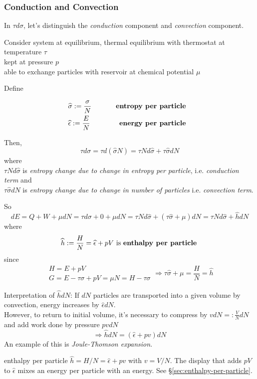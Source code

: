 \subsubsection{Conduction and Convection}\label{SubsubSec:ConductionConvection}

In $\tau d\sigma$, let's distinguish the \emph{conduction} component and \emph{convection} component.

Consider system at equilibrium, thermal equilibrium with thermostat at temperature $\tau$ \\
\qquad kept at pressure $p$ \\
\qquad able to exchange particles with reservoir at chemical potential $\mu$

Define

\[
\begin{aligned}
  & \widehat{\sigma} := \frac{ \sigma}{N } \qquad \, & \text{ \textbf{entropy per particle } } \\
  & \widehat{\epsilon} := \frac{ E}{N } \qquad \, & \text{ \textbf{energy per particle } } 
\end{aligned}
\]

Then, 
\[
\boxed{ 
\tau d\sigma = \tau d(\widehat{\sigma}N) = \tau N d\widehat{\sigma} + \tau \widehat{\sigma} dN
}
\]
where \\

$\tau N d\widehat{\sigma}$ is \emph{entropy change due to change in entropy per particle}, i.e. \emph{conduction term} and \\

$\tau \widehat{\sigma} dN$ is \emph{entropy change due to change in number of particles} i.e. \emph{ convection term}.  

So
\[
dE = Q + W + \mu dN = \tau d\sigma + 0 + \mu dN = \tau Nd\widehat{\sigma} + (\tau \widehat{\sigma} + \mu ) dN = \tau N d\widehat{\sigma} + \widehat{h} dN
\]
where
\[
\widehat{h} := \frac{H}{N} = \widehat{\epsilon} + pV \text{ is \textbf{enthalpy per particle} }
\]
since 
\[
\begin{gathered}
H = E + pV \\ 
G = E-\tau \sigma + pV = \mu N = H-\tau \sigma
\end{gathered} \Longrightarrow \tau \widehat{\sigma} + \mu = \frac{H}{N} = \widehat{h}
\]

Interpretation of $\widehat{h}dN$: If $dN$ particles are transported into a given volume by convection, energy increases by $\widehat{\epsilon}dN$.  \\
However, to return to initial volume, it's necessary to compress by $vdN =: \frac{V}{N}dN$ and add work done by pressure $pvdN$
\[
\Longrightarrow \widehat{h}dN = (\widehat{\epsilon} + pv)dN
\]
An example of this is \emph{Joule-Thomson expansion}.
\begin{correction}{enthalpy per particle}
$\hat h = H/N = \hat\epsilon + pv$ with $v = V/N$.
The display that adds $pV$ to $\hat\epsilon$ mixes an energy per particle with an energy.
See \S\ref{sec:enthalpy-per-particle}.
\end{correction}  

